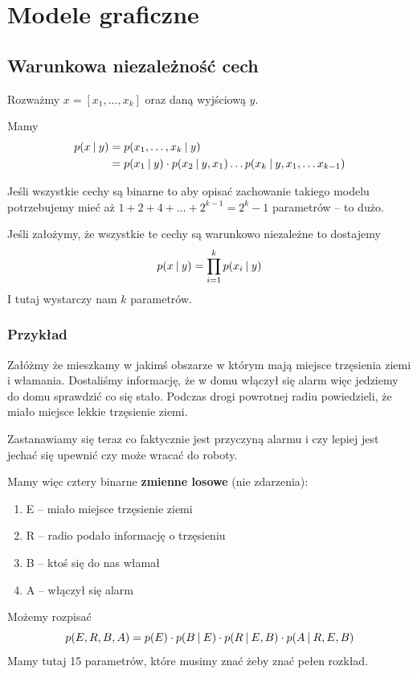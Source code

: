 \chapter{Modele graficzne}

\section{Warunkowa niezależność cech}

Rozważmy \( x = [x_1, \dots, x_k] \) oraz daną wyjściową \( y \).

Mamy 
\begin{align*}
    p(x \:\vert\: y)
        &= p(x_1, \dots, x_k \:\vert\: y) \\
        &= p(x_1 \:\vert\: y) \cdot p(x_2 \:\vert\: y, x_1) \dots p(x_k \:\vert\: y, x_1, \dots x_{k-1})
\end{align*}

Jeśli wszystkie cechy są binarne to aby opisać zachowanie takiego modelu potrzebujemy mieć aż 
\( 1 + 2 + 4 + \dots + 2^{k-1} = 2^k - 1 \) parametrów -- to dużo.

Jeśli założymy, że wszystkie te cechy są warunkowo niezależne to dostajemy
\[
    p(x \:\vert\: y) = \prod_{i=1}^k p(x_i \:\vert\: y)
\]
I tutaj wystarczy nam \( k \) parametrów.

\subsection{Przykład}

Załóżmy że mieszkamy w jakimś obszarze w którym mają miejsce trzęsienia ziemi i włamania. Dostaliśmy informację, że w domu włączył się alarm więc jedziemy do domu sprawdzić co się stało.
Podczas drogi powrotnej radiu powiedzieli, że miało miejsce lekkie trzęsienie ziemi. 

Zastanawiamy się teraz co faktycznie jest przyczyną alarmu i czy lepiej jest jechać się upewnić czy może wracać do roboty.

Mamy więc cztery binarne \textbf{zmienne losowe} (nie zdarzenia):
\begin{enumerate}
    \item E -- miało miejsce trzęsienie ziemi
    \item R -- radio podało informację o trzęsieniu
    \item B -- ktoś się do nas włamał
    \item A -- włączył się alarm
\end{enumerate}

Możemy rozpisać 
\[
    p(E, R, B, A) = p(E) \cdot p(B \:\vert\: E) \cdot p(R \:\vert\: E, B) \cdot p(A \:\vert\: R, E, B)
\]
Mamy tutaj 15 parametrów, które musimy znać żeby znać pełen rozkład.

